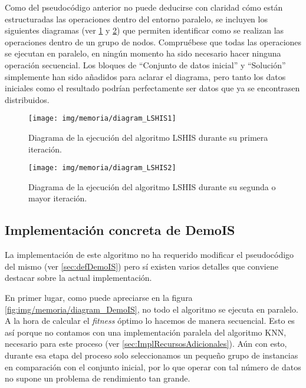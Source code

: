 Como del pseudocódigo anterior no puede deducirse con claridad cómo están estructuradas las operaciones dentro del entorno paralelo, se incluyen los siguientes diagramas (ver \ref{fig:img/memoria/diagram_LSHIS1} y \ref{fig:img/memoria/diagram_LSHIS2}) que permiten identificar como se realizan las operaciones dentro de un grupo de nodos. Compruébese que todas las operaciones se ejecutan en paralelo, en ningún momento ha sido necesario hacer ninguna operación secuencial. Los bloques de ``Conjunto de datos inicial'' y ``Solución'' simplemente han sido añadidos para aclarar el diagrama, pero tanto los datos iniciales como el resultado podrían perfectamente ser datos que ya se encontrasen distribuidos.

	\begin{figure}[!h]
		\centering
		\texttt{[image: img/memoria/diagram\_LSHIS1]}
		\caption{Diagrama de la ejecución del algoritmo LSHIS durante su primera iteración.}\label{fig:img/memoria/diagram_LSHIS1}
	\end{figure}
	\FloatBarrier
	
		\begin{figure}[!h]
		\centering
		\texttt{[image: img/memoria/diagram\_LSHIS2]}
		\caption{Diagrama de la ejecución del algoritmo LSHIS durante su segunda o mayor iteración.}\label{fig:img/memoria/diagram_LSHIS2}
	\end{figure}
	\FloatBarrier



\subsection{Implementación concreta de DemoIS}

La implementación de este algoritmo no ha requerido modificar el pseudocódigo del mismo (ver \ref{sec:defDemoIS}) pero sí existen varios detalles que conviene destacar sobre la actual implementación.

En primer lugar, como puede apreciarse en la figura \ref{fig:img/memoria/diagram_DemoIS}, no todo el algoritmo se ejecuta en paralelo. A la hora de calcular el \textit{fitness} óptimo lo hacemos de manera secuencial. Esto es así porque no contamos con una implementación paralela del algoritmo KNN, necesario para este proceso (ver \ref{sec:ImplRecursosAdicionales}). Aún con esto, durante esa etapa del proceso solo seleccionamos un pequeño grupo de instancias en comparación con el conjunto inicial, por lo que operar con tal número de datos no supone un problema de rendimiento tan grande.


